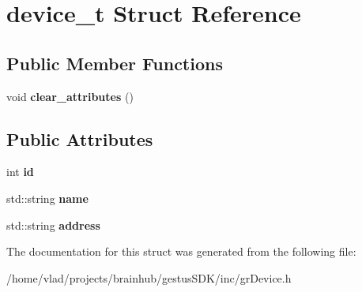 \hypertarget{structdevice__t}{}\section{device\+\_\+t Struct Reference}
\label{structdevice__t}
\subsection*{Public Member Functions}
\begin{DoxyCompactItemize}
\item 
\mbox{\label{structdevice__t_ac77b0b37f8860be8c8ea2fc236e831c2}} 
void {\bfseries clear\+\_\+attributes} ()
\end{DoxyCompactItemize}
\subsection*{Public Attributes}
\begin{DoxyCompactItemize}
\item 
\mbox{\label{structdevice__t_ab6fb06faaf77e3218eba621ce4b9e156}} 
int {\bfseries id}
\item 
\mbox{\label{structdevice__t_adb384c5c8cb489d608dcb7b80a40b52c}} 
std\+::string {\bfseries name}
\item 
\mbox{\label{structdevice__t_a3ebddb374c44b31ada528da828e0bcdf}} 
std\+::string {\bfseries address}
\end{DoxyCompactItemize}


The documentation for this struct was generated from the following file\+:\begin{DoxyCompactItemize}
\item 
/home/vlad/projects/brainhub/gestus\+S\+D\+K/inc/gr\+Device.\+h\end{DoxyCompactItemize}
